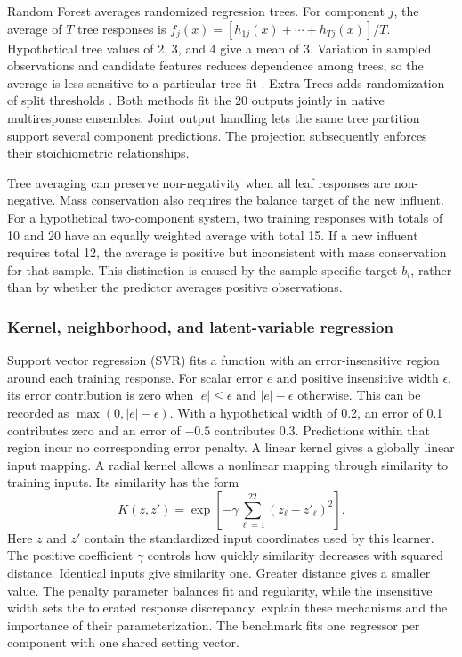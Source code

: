Random Forest averages randomized regression trees. For component $j$, the average of $T$ tree responses is $f_j(x)=[h_{1j}(x)+\cdots+h_{Tj}(x)]/T$. Hypothetical tree values of 2, 3, and 4 give a mean of 3. Variation in sampled observations and candidate features reduces dependence among trees, so the average is less sensitive to a particular tree fit \citep{Breiman2001}. Extra Trees adds randomization of split thresholds \citep{Geurts2006}. Both methods fit the 20 outputs jointly in native multiresponse ensembles. Joint output handling lets the same tree partition support several component predictions. The projection subsequently enforces their stoichiometric relationships.

Tree averaging can preserve non-negativity when all leaf responses are non-negative. Mass conservation also requires the balance target of the new influent. For a hypothetical two-component system, two training responses with totals of 10 and 20 have an equally weighted average with total 15. If a new influent requires total 12, the average is positive but inconsistent with mass conservation for that sample. This distinction is caused by the sample-specific target $b_i$, rather than by whether the predictor averages positive observations.

\subsubsection{Kernel, neighborhood, and latent-variable regression}

Support vector regression (SVR) fits a function with an error-insensitive region around each training response. For scalar error $e$ and positive insensitive width $\epsilon$, its error contribution is zero when $|e|\leq\epsilon$ and $|e|-\epsilon$ otherwise. This can be recorded as $\max(0,|e|-\epsilon)$. With a hypothetical width of 0.2, an error of 0.1 contributes zero and an error of $-0.5$ contributes 0.3. Predictions within that region incur no corresponding error penalty. A linear kernel gives a globally linear input mapping. A radial kernel allows a nonlinear mapping through similarity to training inputs. Its similarity has the form
\[
K(z,z')=\exp\!\left[-\gamma\sum_{\ell=1}^{22}(z_\ell-z'_\ell)^2\right].
\]
Here $z$ and $z'$ contain the standardized input coordinates used by this learner. The positive coefficient $\gamma$ controls how quickly similarity decreases with squared distance. Identical inputs give similarity one. Greater distance gives a smaller value. The penalty parameter balances fit and regularity, while the insensitive width sets the tolerated response discrepancy. \citet{SmolaScholkopf2004} explain these mechanisms and the importance of their parameterization. The benchmark fits one regressor per component with one shared setting vector.

